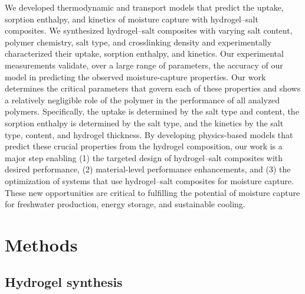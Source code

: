 \documentclass[11pt]{article}
\begin{document}
We developed thermodynamic and transport models that predict the uptake, sorption enthalpy, and kinetics of moisture capture with hydrogel--salt composites. We synthesized hydrogel--salt composites with varying salt content, polymer chemistry, salt type, and crosslinking density and experimentally characterized their uptake, sorption enthalpy, and kinetics. Our experimental measurements validate, over a large range of parameters, the accuracy of our model in predicting the observed moisture-capture properties. Our work determines the critical parameters that govern each of these properties and shows a relatively negligible role of the polymer in the performance of all analyzed polymers. Specifically, the uptake is determined by the salt type and content, the sorption enthalpy is determined by the salt type, and the kinetics by the salt type, content, and hydrogel thickness. By developing physics-based models that predict these crucial properties from the hydrogel composition, our work is a major step enabling (1) the targeted design of hydrogel--salt composites with desired performance, (2) material-level performance enhancements, and (3) the optimization of systems that use hydrogel--salt composites for moisture capture. These new opportunities are critical to fulfilling the potential of moisture capture for freshwater production, energy storage, and sustainable cooling.

\section{Methods}

\subsection{Hydrogel synthesis}
\end{document}
